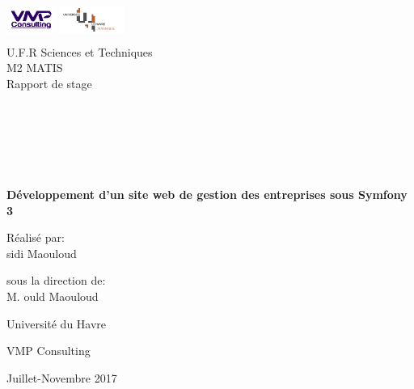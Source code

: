 \documentclass[12pt]{article}
\begin{document}
\begin{titlepage}
\begin{center}

\hfill
\vfill
\bigskip
\huge{ \includegraphics[width=60,height=50]{logo.png} 
\includegraphics[width=80,height=50]{lh.png} \\
U.F.R Sciences et Techniques \\
M2 MATIS  \\
 Rapport de stage \\  \\ \\ \\ \\
 } 
\vfill
\bigskip 
\Huge 
\bigskip %
\\ \\
\textbf{ Développement d'un site web de gestion des entreprises sous Symfony 3 } \par 
\vfill

\Large \begin{flushleft}
 Réalisé par:\\ sidi Maouloud \par
\end{flushleft}
		 
		  \begin{flushright}
		                    sous la direction de:\\  M. ould Maouloud
		                   \end{flushright}



		 
\vfill
\Large Université du Havre \par \Large VMP Consulting		
		\bigskip 
\bigskip

\Large
Juillet-Novembre 2017
\end{center}
\end{titlepage}
\end{document}
